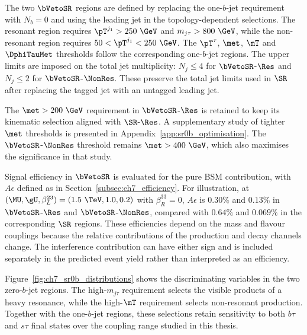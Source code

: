 The two $\bVetoSR$ regions are defined by replacing the one-$b$-jet requirement with $N_b=0$ and using the leading jet in the topology-dependent selections.
The resonant region requires $\pT^{j_1}>250~\GeV$ and $m_{j\tau}>800~\GeV$, while the non-resonant region requires $50<\pT^{j_1}<250~\GeV$.
The $\pT^\tau$, $\met$, $\mT$ and $\DphiTauMet$ thresholds follow the corresponding one-$b$-jet regions.
The upper limits are imposed on the total jet multiplicity: $N_j\leq4$ for $\bVetoSR$-$\Res$ and $N_j\leq2$ for $\bVetoSR$-$\NonRes$.
These preserve the total jet limits used in $\SR$ after replacing the tagged jet with an untagged leading jet.

The $\met>200~\GeV$ requirement in $\bVetoSR$-$\Res$ is retained to keep its kinematic selection aligned with $\SR$-$\Res$.
A supplementary study of tighter $\met$ thresholds is presented in Appendix~\ref{app:sr0b_optimisation}.
The $\bVetoSR$-$\NonRes$ threshold remains $\met>400~\GeV$, which also maximises the significance in that study.

Signal efficiency in $\bVetoSR$ is evaluated for the pure BSM contribution, with $A\epsilon$ defined as in Section~\ref{subsec:ch7_efficiency}.
For illustration, at $(\MU,\gU,\beta_L^{23})=(1.5~\TeV,1.0,0.2)$ with $\beta_R^{33}=0$, $A\epsilon$ is $0.30\%$ and $0.13\%$ in $\bVetoSR$-$\Res$ and $\bVetoSR$-$\NonRes$, compared with $0.64\%$ and $0.069\%$ in the corresponding $\SR$ regions.
These efficiencies depend on the mass and flavour couplings because the relative contributions of the production and decay channels change.
The interference contribution can have either sign and is included separately in the predicted event yield rather than interpreted as an efficiency.

Figure~\ref{fig:ch7_sr0b_distributions} shows the discriminating variables in the two zero-$b$-jet regions.
The high-$m_{j\tau}$ requirement selects the visible products of a heavy resonance, while the high-$\mT$ requirement selects non-resonant production.
Together with the one-$b$-jet regions, these selections retain sensitivity to both $b\tau$ and $s\tau$ final states over the coupling range studied in this thesis.


